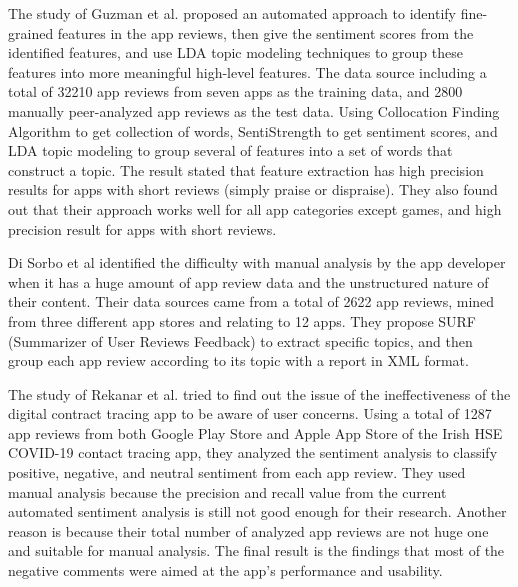 \documentclass[12pt]{article}
\begin{document}
The study of Guzman et al. \cite{fine_grained} proposed an automated approach to identify fine-grained features in the app reviews, then give the sentiment scores from the identified features, and use LDA topic modeling techniques to group these features into more meaningful high-level features. The data source including a total of 32210 app reviews from seven apps as the training data, and 2800 manually peer-analyzed app reviews as the test data. Using Collocation Finding Algorithm to get collection of words, SentiStrength to get sentiment scores, and LDA topic modeling to group several of features into a set of words that construct a topic. The result stated that feature extraction has high precision results for apps with short reviews (simply praise or dispraise). They also found out that their approach works well for all app categories except games, and high precision result for apps with short reviews.

Di Sorbo et al \cite{surf} identified the difficulty with manual analysis by the app developer when it has a huge amount of app review data and the unstructured nature of their content. Their data sources came from a total of 2622 app reviews, mined from three different app stores and relating to 12 apps. They propose SURF (Summarizer of User Reviews Feedback)  to extract specific topics, and then group each app review according to its topic with a report in XML format.

The study of Rekanar et al. \cite{sentiment_analysis_hse_ireland} tried to find out the issue of the ineffectiveness of the digital contract tracing app to be aware of user concerns. Using a total of 1287 app reviews from both Google Play Store and Apple App Store of the Irish HSE COVID-19 contact tracing app, they analyzed the sentiment analysis to classify positive, negative, and neutral sentiment from each app review. They used manual analysis because the precision and recall value from the current automated sentiment analysis is still not good enough for their research. Another reason is because their total number of analyzed app reviews are not huge one and suitable for manual analysis. The final result is the findings that most of the negative comments were aimed at the app’s performance and usability.
\end{document}
